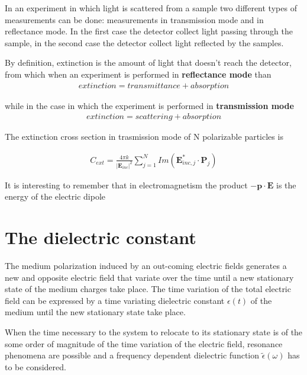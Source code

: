 In an experiment in which light is scattered from a sample two different types of measurements can be done: measurements in transmission mode and in reflectance mode. In the first case the detector collect light passing through the sample, in the second case the detector collect light reflected by the samples.

By definition, extinction is the amount of light that doesn't reach the detector, from which when an experiment is performed in {\bf reflectance mode} than 
\begin{eqnarray}
	extinction = transmittance + absorption
\end{eqnarray}

while in the case in which the experiment is performed in {\bf transmission mode}
\begin{eqnarray}
	extinction = scattering + absorption
\end{eqnarray}



The extinction cross section in trasmission mode of N polarizable particles is \cite{zhao2003}

\begin{eqnarray}
	C_{ext} = \frac{ 4\pi k }{ | \mathbf{ E}_{inc} |^2 }\sum_{j = 1}^N Im\left( \mathbf{ E}_{inc, j}^*\cdot \mathbf{P}_j \right)
\end{eqnarray}

It is interesting to remember that in electromagnetism the product $-\mathbf{p}\cdot\mathbf{E}$ is the energy of the electric dipole




\section{The dielectric constant}


The medium polarization induced by an out-coming electric fields generates a new and opposite electric field that variate over the time until a new stationary state of the medium charges take place. The time variation of the total electric field can be expressed by a time variating dielectric constant $\epsilon (t)$ of the medium until the new stationary state take place.

When the time necessary to the system to relocate to its stationary state is of the some order of magnitude of the time variation of the electric field, resonance phenomena are  possible and a frequency dependent dielectric function $\widetilde{\epsilon}(\omega) $ has to be considered.



